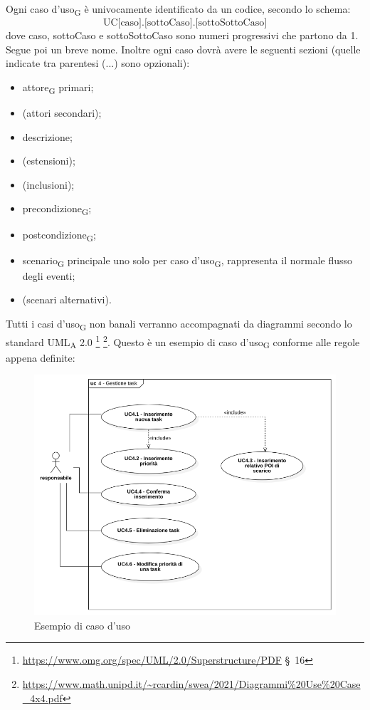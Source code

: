                 Ogni caso d'uso\textsubscript{G} è univocamente identificato da un codice, secondo lo schema:
                $$\text{UC[caso].[sottoCaso].[sottoSottoCaso]}$$
                dove caso, sottoCaso e sottoSottoCaso sono numeri progressivi che partono da 1. Segue poi un breve nome. Inoltre ogni caso dovrà avere le seguenti sezioni (quelle indicate tra parentesi (...) sono opzionali):
                \begin{itemize}
                    \item attore\textsubscript{G} primari;
                    \item (attori secondari);
                    \item descrizione;
                    \item (estensioni);
                    \item (inclusioni);
                    \item precondizione\textsubscript{G};
                    \item postcondizione\textsubscript{G};
                    \item scenario\textsubscript{G} principale uno solo per caso d'uso\textsubscript{G}, rappresenta il normale flusso degli eventi;
                    \item (scenari alternativi).
                \end{itemize}

                Tutti i casi d'uso\textsubscript{G} non banali verranno accompagnati da diagrammi secondo lo standard UML\textsubscript{A} 2.0 \footnote{\url{https://www.omg.org/spec/UML/2.0/Superstructure/PDF} \S\ 16} \footnote{\url{https://www.math.unipd.it/~rcardin/swea/2021/Diagrammi\%20Use\%20Case_4x4.pdf}}.
                Questo è un esempio di caso d'uso\textsubscript{G} conforme alle regole appena definite:
                \begin{figure}[H]
                    \centering
                    \includegraphics[scale=0.5]{res/images/esempio_use_case.png}
                    \caption{Esempio di caso d'uso}
                \end{figure}

